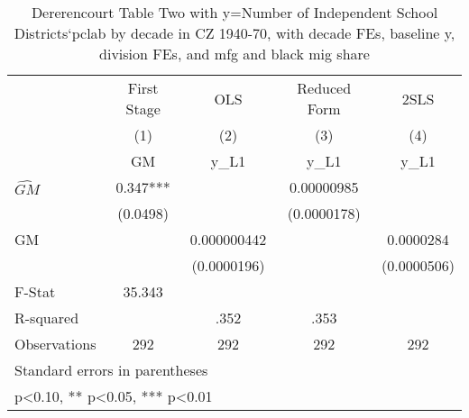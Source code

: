 \begin{table}[htbp]\centering
\def\sym#1{\ifmmode^{#1}\else\(^{#1}\)\fi}
\caption{Dererencourt Table Two with y=Number of Independent School Districts`pclab by decade in CZ 1940-70, with decade FEs, baseline y, division FEs, and mfg and black mig share}
\begin{tabular}{l*{4}{c}}
\toprule
                    & First Stage   &         OLS   &Reduced Form   &        2SLS   \\
                    &\multicolumn{1}{c}{(1)}&\multicolumn{1}{c}{(2)}&\multicolumn{1}{c}{(3)}&\multicolumn{1}{c}{(4)}\\
                    &\multicolumn{1}{c}{GM}&\multicolumn{1}{c}{y\_L1}&\multicolumn{1}{c}{y\_L1}&\multicolumn{1}{c}{y\_L1}\\
\midrule
$\hat{GM}$          &       0.347***&               &  0.00000985   &               \\
                    &    (0.0498)   &               & (0.0000178)   &               \\
\addlinespace
GM                  &               & 0.000000442   &               &   0.0000284   \\
                    &               & (0.0000196)   &               & (0.0000506)   \\
\midrule
F-Stat              &      35.343   &               &               &               \\
R-squared           &               &        .352   &        .353   &               \\
Observations        &         292   &         292   &         292   &         292   \\
\bottomrule
\multicolumn{5}{l}{\footnotesize Standard errors in parentheses}\\
\multicolumn{5}{l}{\footnotesize * p<0.10, ** p<0.05, *** p<0.01}\\
\end{tabular}
\end{table}
